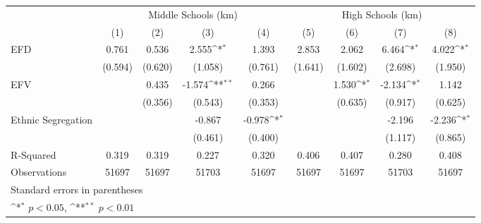 {
\def\sym#1{\ifmmode^{#1}\else\(^{#1}\)\fi}
\begin{tabular}{l*{8}{c}}
\toprule
                    &\multicolumn{4}{c}{Middle Schools (km)}                                            &\multicolumn{4}{c}{High Schools (km)}                                              \\\cmidrule(lr){2-5}\cmidrule(lr){6-9}
                    &\multicolumn{1}{c}{(1)}        &\multicolumn{1}{c}{(2)}        &\multicolumn{1}{c}{(3)}        &\multicolumn{1}{c}{(4)}        &\multicolumn{1}{c}{(5)}        &\multicolumn{1}{c}{(6)}        &\multicolumn{1}{c}{(7)}        &\multicolumn{1}{c}{(8)}        \\
\midrule
EFD                 &       0.761        &       0.536        &       2.555\sym{*} &       1.393        &       2.853        &       2.062        &       6.464\sym{*} &       4.022\sym{*} \\
                    &     (0.594)        &     (0.620)        &     (1.058)        &     (0.761)        &     (1.641)        &     (1.602)        &     (2.698)        &     (1.950)        \\
EFV                 &                    &       0.435        &      -1.574\sym{**}&       0.266        &                    &       1.530\sym{*} &      -2.134\sym{*} &       1.142        \\
                    &                    &     (0.356)        &     (0.543)        &     (0.353)        &                    &     (0.635)        &     (0.917)        &     (0.625)        \\
Ethnic Segregation  &                    &                    &      -0.867        &      -0.978\sym{*} &                    &                    &      -2.196        &      -2.236\sym{*} \\
                    &                    &                    &     (0.461)        &     (0.400)        &                    &                    &     (1.117)        &     (0.865)        \\
\midrule
R-Squared           &\multicolumn{1}{c}{0.319}        &\multicolumn{1}{c}{0.319}        &\multicolumn{1}{c}{0.227}        &\multicolumn{1}{c}{0.320}        &\multicolumn{1}{c}{0.406}        &\multicolumn{1}{c}{0.407}        &\multicolumn{1}{c}{0.280}        &\multicolumn{1}{c}{0.408}        \\
Observations        &\multicolumn{1}{c}{51697}        &\multicolumn{1}{c}{51697}        &\multicolumn{1}{c}{51703}        &\multicolumn{1}{c}{51697}        &\multicolumn{1}{c}{51697}        &\multicolumn{1}{c}{51697}        &\multicolumn{1}{c}{51703}        &\multicolumn{1}{c}{51697}        \\
\bottomrule
\multicolumn{9}{l}{\footnotesize Standard errors in parentheses}\\
\multicolumn{9}{l}{\footnotesize \sym{*} \(p<0.05\), \sym{**} \(p<0.01\)}\\
\end{tabular}
}
